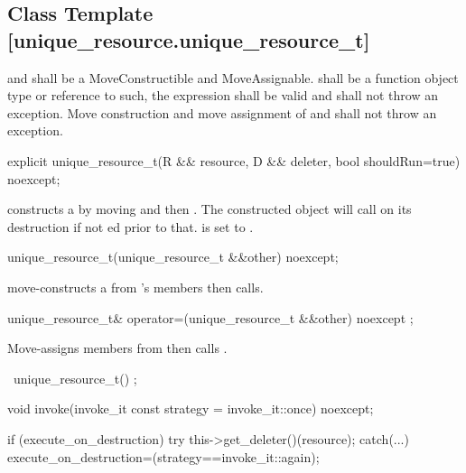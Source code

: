 \documentclass[ebook,11pt,article]{memoir}
\begin{document}
\subsection {Class Template  [unique_resource.unique_resource_t]}

\pnum
\requires  {} and  shall be a MoveConstructible and MoveAssignable.
 shall be a function object type or reference to such, 
the expression  shall be valid
and shall not throw an exception.  %
Move construction and move assignment of  and  shall not throw an exception.


\begin{itemdecl}
explicit
unique_resource_t(R && resource, D && deleter, bool shouldRun=true) noexcept;
\end{itemdecl}

\pnum
\effects constructs a  by moving  and then . The constructed object will call  on its destruction if not ed prior to that.  is set to .

\begin{itemdecl}
unique_resource_t(unique_resource_t &&other) noexcept;
\end{itemdecl}

\pnum
\effects move-constructs a  from 's members then calls.

\begin{itemdecl}
unique_resource_t& operator=(unique_resource_t  &&other) noexcept ;
\end{itemdecl}

\pnum
\effects {} Move-assigns members from  then calls .

\begin{itemdecl}
~unique_resource_t() ;
\end{itemdecl}

\pnum
\effects {}

\begin{itemdecl}
void invoke(invoke_it const strategy = invoke_it::once) noexcept;
\end{itemdecl}

\pnum
\effects 
\begin{codeblock}
if (execute_on_destruction) try {
	this->get_deleter()(resource);
} catch(...){}
execute_on_destruction=(strategy==invoke_it::again);
\end{codeblock}
\end{document}
